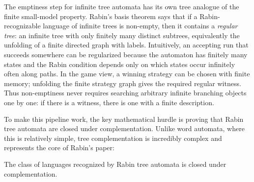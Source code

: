 \begin{formaldetails}
The emptiness step for infinite tree automata has its own tree analogue of the finite small-model property. Rabin's basis theorem says that if a Rabin-recognizable language of infinite trees is non-empty, then it contains a \emph{regular tree}: an infinite tree with only finitely many distinct subtrees, equivalently the unfolding of a finite directed graph with labels. Intuitively, an accepting run that succeeds somewhere can be regularized because the automaton has finitely many states and the Rabin condition depends only on which states occur infinitely often along paths. In the game view, a winning strategy can be chosen with finite memory; unfolding the finite strategy graph gives the required regular witness. Thus non-emptiness never requires searching arbitrary infinite branching objects one by one: if there is a witness, there is one with a finite description.
\end{formaldetails}

To make this pipeline work, the key mathematical hurdle is proving that Rabin tree automata are closed under complementation. Unlike word automata, where this is relatively simple, tree complementation is incredibly complex and represents the core of Rabin's paper:

\begin{theorem}
The class of languages recognized by Rabin tree automata is closed under complementation.
\end{theorem}

